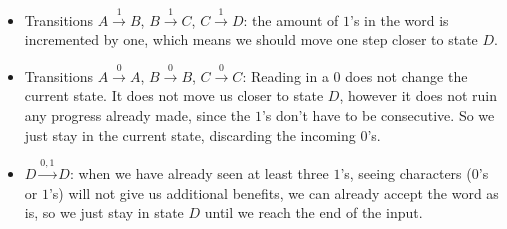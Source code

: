 \begin{itemize}
    \item Transitions $A\xrightarrow{1}B$, $B\xrightarrow{1}C$, $C\xrightarrow{1}D$: the amount of $1$'s in the word is incremented by one, which means we should move one step closer to state $D$.
    \item Transitions $A\xrightarrow{0}A$, $B\xrightarrow{0}B$, $C\xrightarrow{0}C$: Reading in a $0$ does not change the current state. It does not move us closer to state $D$, however it does not ruin any progress already made, since the $1$'s don't have to be consecutive. So we just stay in the current state, discarding the incoming $0$'s.
    \item $D\xrightarrow{0,1}D$: when we have already seen at least three $1$'s, seeing characters ($0$'s or $1$'s) will not give us additional benefits, we can already accept the word as is, so we just stay in state $D$ until we reach the end of the input.
\end{itemize}